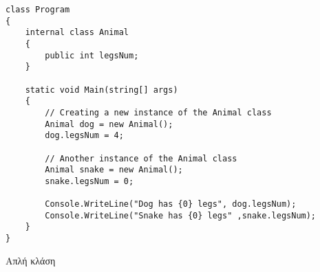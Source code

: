 \begin{listing}[H]
\begin{verbatim}
class Program
{
    internal class Animal
    {
        public int legsNum;
    }

    static void Main(string[] args)
    {
        // Creating a new instance of the Animal class
        Animal dog = new Animal();
        dog.legsNum = 4;
        
        // Another instance of the Animal class
        Animal snake = new Animal();
        snake.legsNum = 0;
        
        Console.WriteLine("Dog has {0} legs", dog.legsNum);
        Console.WriteLine("Snake has {0} legs" ,snake.legsNum);
    }
}
\end{verbatim}
\caption{Απλή κλάση}
\label{animal_simple}
\end{listing}